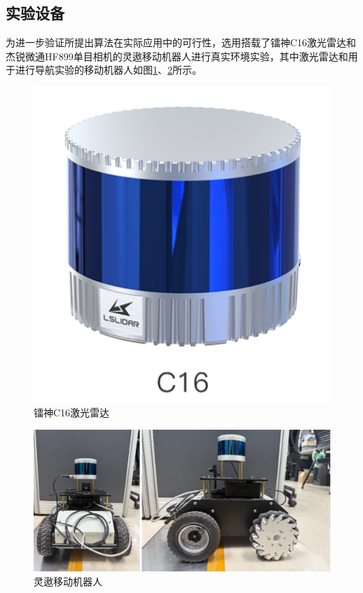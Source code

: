\subsection{实验设备}%
为进一步验证所提出算法在实际应用中的可行性，选用搭载了镭神C16激光雷达和杰锐微通HF899单目相机的灵遨移动机器人进行真实环境实验，其中激光雷达和用于进行导航实验的移动机器人如图\ref{C16laser}、\ref{mycar}所示。

\begin{figure}[h]
    \centering
    \includegraphics[scale=0.3]{Fig/C16laser.png}
    \caption{\label{C16laser}镭神C16激光雷达}
\end{figure}

\begin{figure}[htbp]
    \centering
    \includegraphics[scale=0.17]{Fig/robot.png}
    \caption{\label{mycar}灵遨移动机器人}
\end{figure}

